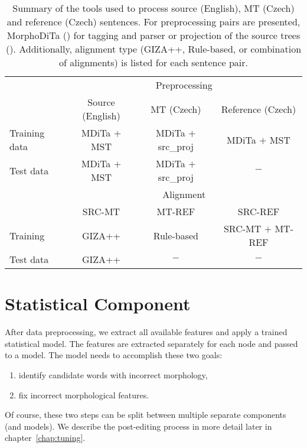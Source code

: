 
\begin{table*}[t]
\centering
\small

\begin{threeparttable}
\begin{tabular}{|l|c|c|c|}
\hline
\multirow{2}{*}{}  &  \multicolumn{3}{c|}{Preprocessing}  \\
\cline{2-4}
&  Source (English)  &  MT (Czech)  & Reference (Czech)  \\
\hline
Training data &  MDiTa $+$ MST  & MDiTa $+$ src\_proj &  MDiTa $+$ MST  \\
\hline
Test data &  MDiTa $+$ MST  &  MDiTa $+$ src\_proj  & $-$ \\
\hline
\hline
\multirow{2}{*}{}  &  \multicolumn{3}{c|}{Alignment} \\
\cline{2-4}
& SRC-MT & MT-REF & SRC-REF \\
\hline
Training  & GIZA++ & Rule-based & SRC-MT $+$ MT-REF \\
Test data  & GIZA++ & $-$ & $-$ \\
\hline
\end{tabular}
\end{threeparttable}
\caption[Summary of the main tools used for processing English and Czech sentences]{
Summary of the tools used to process source (English), MT (Czech) and reference (Czech) sentences. For preprocessing
 pairs are presented, MorphoDiTa () for tagging and  parser or projection of the source
trees (). Additionally, alignment type (GIZA++, Rule-based, or combination of alignments) is listed
for each sentence pair.
}
\label{summary-analysis}
\end{table*}


\section{Statistical Component}

After data preprocessing, we extract all available features and
apply a trained statistical model. The features are extracted separately for each node and passed
to a model. The model needs to accomplish these two goals:
\begin{enumerate}
    \item identify candidate words with incorrect morphology,
    \item fix incorrect morphological features.
\end{enumerate}
Of course, these two steps can be split between multiple separate components (and models).
We describe the post-editing process in more detail later in chapter~\ref{chap:tuning}.

